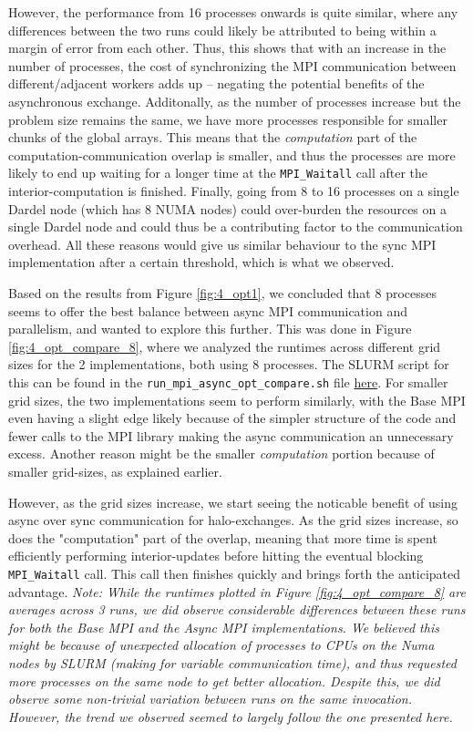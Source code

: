 \documentclass[a4paper,10pt]{article}
\begin{document}
\begin{multicols}{2}
However, the performance from 16 processes onwards is quite similar, where any differences between the two runs could likely be attributed to being within a margin of error from each other. Thus, this shows that with an increase in the number of processes, the cost of synchronizing the MPI communication between different/adjacent workers adds up -- negating the potential benefits of the asynchronous exchange. Additonally, as the number of processes increase but the problem size remains the same, we have more processes responsible for smaller chunks of the global arrays. This means that the \textit{computation} part of the computation-communication overlap is smaller, and thus the processes are more likely to end up waiting for a longer time at the \verb|MPI_Waitall| call after the interior-computation is finished. Finally, going from 8 to 16 processes on a single Dardel node (which has 8 NUMA nodes) could over-burden the resources on a single Dardel node and could thus be a contributing factor to the communication overhead. All these reasons would give us similar behaviour to the sync MPI implementation after a certain threshold, which is what we observed.

Based on the results from Figure \ref{fig:4_opt1}, we concluded that 8 processes seems to offer the best balance between async MPI communication and parallelism, and wanted to explore this further. This was done in Figure \ref{fig:4_opt_compare_8}, where we analyzed the runtimes across different grid sizes for the 2 implementations, both using 8 processes. The SLURM script for this can be found in the \verb|run_mpi_async_opt_compare.sh| file \href{https://github.com/paulmyr/DD2356-MethodsHPC/blob/master/5_project/4_opt/run_mpi_async_opt_compare.sh}{here}. For smaller grid sizes, the two implementations seem to perform similarly, with the Base MPI even having a slight edge likely because of the simpler structure of the code and fewer calls to the MPI library making the async communication an unnecessary excess. Another reason might be the smaller \textit{computation} portion because of smaller grid-sizes, as explained earlier.

However, as the grid sizes increase, we start seeing the noticable benefit of using async over sync communication for halo-exchanges. As the grid sizes increase, so does the "computation" part of the overlap, meaning that more time is spent efficiently performing interior-updates before hitting the eventual blocking \verb|MPI_Waitall| call. This call then finishes quickly and brings forth the anticipated advantage.
\textit{Note: While the runtimes plotted in Figure \ref{fig:4_opt_compare_8} are averages across 3 runs, we did observe considerable differences between these runs for both the Base MPI and the Async MPI implementations. We believed this might be because of unexpected allocation of processes to CPUs on the Numa nodes by SLURM (making for variable communication time), and thus requested more processes on the same node to get better allocation. Despite this, we did observe some non-trivial variation between runs on the same invocation. However, the trend we observed seemed to largely follow the one presented here.}


\end{multicols}
\end{document}
